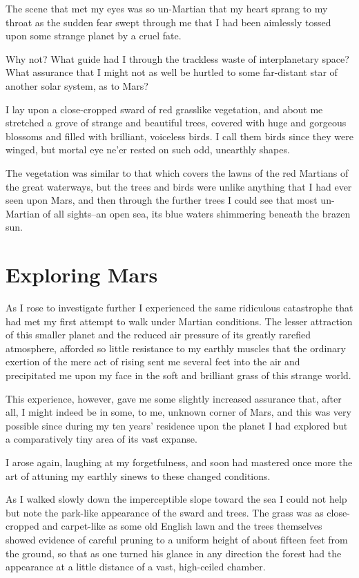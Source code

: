 \documentclass[11pt,a4paper,twocolumn]{article}
\begin{document}
The scene that met my eyes was so un-Martian that my heart sprang to my
throat as the sudden fear swept through me that I had been aimlessly
tossed upon some strange planet by a cruel fate.

Why not?  What guide had I through the trackless waste of
interplanetary space?  What assurance that I might not as well be
hurtled to some far-distant star of another solar system, as to Mars?

I lay upon a close-cropped sward of red grasslike vegetation, and about
me stretched a grove of strange and beautiful trees, covered with huge
and gorgeous blossoms and filled with brilliant, voiceless birds.  I
call them birds since they were winged, but mortal eye ne'er rested on
such odd, unearthly shapes.

The vegetation was similar to that which covers the lawns of the red
Martians of the great waterways, but the trees and birds were unlike
anything that I had ever seen upon Mars, and then through the further
trees I could see that most un-Martian of all sights--an open sea, its
blue waters shimmering beneath the brazen sun.

\section{Exploring Mars}

As I rose to investigate further I experienced the same ridiculous
catastrophe that had met my first attempt to walk under Martian
conditions.  The lesser attraction of this smaller planet and the
reduced air pressure of its greatly rarefied atmosphere, afforded so
little resistance to my earthly muscles that the ordinary exertion of
the mere act of rising sent me several feet into the air and
precipitated me upon my face in the soft and brilliant grass of this
strange world.

This experience, however, gave me some slightly increased assurance
that, after all, I might indeed be in some, to me, unknown corner of
Mars, and this was very possible since during my ten years' residence
upon the planet I had explored but a comparatively tiny area of its
vast expanse.

I arose again, laughing at my forgetfulness, and soon had mastered once
more the art of attuning my earthly sinews to these changed conditions.

As I walked slowly down the imperceptible slope toward the sea I could
not help but note the park-like appearance of the sward and trees.  The
grass was as close-cropped and carpet-like as some old English lawn and
the trees themselves showed evidence of careful pruning to a uniform
height of about fifteen feet from the ground, so that as one turned his
glance in any direction the forest had the appearance at a little
distance of a vast, high-ceiled chamber.
\end{document}
